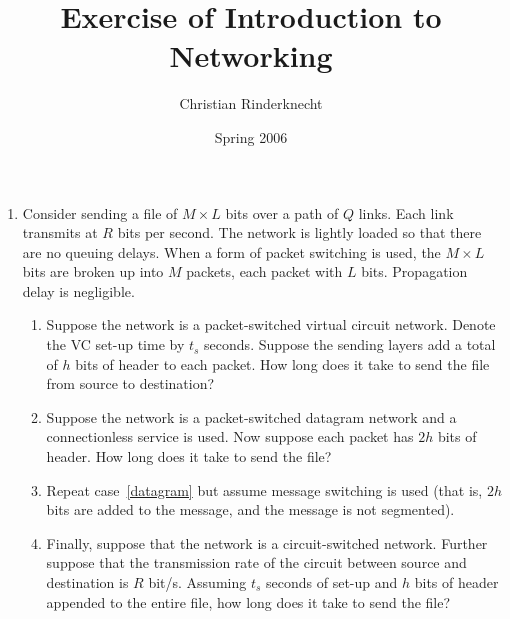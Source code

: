 \documentclass[11pt,a4paper]{article}
\title{Exercise of Introduction to Networking}
\author{Christian Rinderknecht}
\date{Spring 2006}
\begin{document}
\maketitle

\begin{enumerate}

  \item Consider sending a file of \(M \times L\) bits over a path of
    \(Q\) links. Each link transmits at \(R\) bits per second. The
    network is lightly loaded so that there are no queuing
    delays. When a form of packet switching is used, the \(M \times
    L\) bits are broken up into \(M\) packets, each packet with \(L\)
    bits. Propagation delay is negligible.
    \begin{enumerate}

      \item Suppose the network is a packet-switched virtual circuit
        network. Denote the VC set-up time by \(t_s\) seconds. Suppose
        the sending layers add a total of \(h\) bits of header to each
        packet. How long does it take to send the file from source to
        destination?

      \item \label{datagram} Suppose the network is a packet-switched
        datagram network and a connectionless service is used. Now
        suppose each packet has \(2h\) bits of header. How long does
        it take to send the file?

      \item Repeat case~\ref{datagram} but assume message switching is
        used (that is, \(2h\) bits are added to the message, and the
        message is not segmented).

      \item Finally, suppose that the network is a circuit-switched
        network. Further suppose that the transmission rate of the
        circuit between source and destination is \(R\)
        bit/s. Assuming \(t_s\) seconds of set-up and \(h\) bits of
        header appended to the entire file, how long does it take to
        send the file?

    \end{enumerate}


\end{enumerate}
\end{document}
